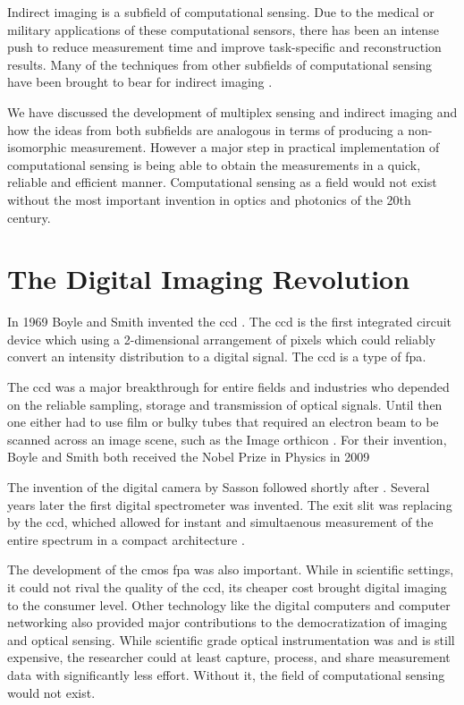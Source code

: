 Indirect imaging is a subfield of computational sensing. Due to the medical or military applications of these computational sensors, there has been an intense push to reduce measurement time and improve task-specific and reconstruction results. Many of the techniques from other subfields of computational sensing have been brought to bear for indirect imaging \cite{zhu2010tomographic, chen2012compressive}. 

We have discussed the development of multiplex sensing and indirect imaging and how the ideas from both subfields are analogous in terms of producing a non-isomorphic measurement. However a major step in practical implementation of computational sensing is being able to obtain the measurements in a quick, reliable and efficient manner. Computational sensing as a field would not exist without the most important invention in optics and photonics of the 20th century. 

\section{The Digital Imaging Revolution}

In 1969 Boyle and Smith invented the \gls{ccd} \cite{boyle1970charge}. The \gls{ccd} is the first integrated circuit device which using a 2-dimensional arrangement of pixels which could reliably convert an intensity distribution to a digital signal. The \gls{ccd} is a type of \gls{fpa}. 

The \gls{ccd} was a major breakthrough for entire fields and industries who depended on the reliable sampling, storage and transmission of optical signals. Until then one either had to use film or bulky tubes that required an electron beam to be scanned across an image scene, such as the Image orthicon \cite{w1975image}. For their invention, Boyle and Smith both received the Nobel Prize in Physics in 2009 \cite{nobelprize2009physics}

The invention of the digital camera by Sasson followed shortly after \cite{kodaksfirstdigital2015}. Several years later the first digital spectrometer was invented. The exit slit was replacing by the \gls{ccd}, whiched allowed for instant and simultaenous measurement of the entire spectrum in a compact architecture \cite{moore1979spectrometer}. 

The development of the \gls{cmos} \gls{fpa} was also important. While in scientific settings, it could not rival the quality of the \gls{ccd}, its cheaper cost brought digital imaging to the consumer level. Other technology like the digital computers and computer networking also provided major contributions to the democratization of imaging and optical sensing. While scientific grade optical instrumentation was and is still expensive, the researcher could at least capture, process, and share measurement data with significantly less effort. Without it, the field of computational sensing would not exist.


